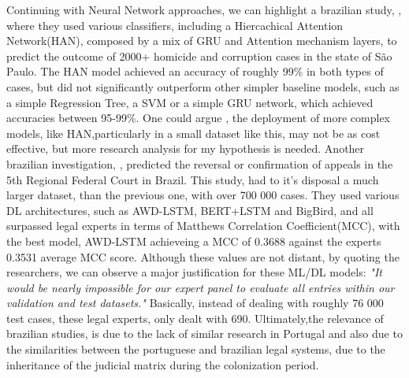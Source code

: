 \documentclass[11pt,a4paper,twoside,openright]{book}
\begin{document}
\par Continuing with Neural Network approaches, we can highlight a brazilian study, \textcite{bertalan_using_2024}, where they used various classifiers, 
including a Hiercachical Attention Network(HAN), composed by a mix of GRU and Attention mechanism layers, to predict the outcome of 2000+ homicide and corruption cases in the state of São Paulo.
The HAN model achieved an accuracy of roughly 99\% in both types of cases, but did not significantly outperform other simpler baseline models,
such as a simple Regression Tree, a SVM or a simple GRU network, which achieved accuracies between 95-99\%. One could argue , the deployment of more complex models, like HAN,particularly in a small dataset like this, may not be as 
cost effective, but more research analysis for my hypothesis is needed.
Another brazilian investigation, \textcite{menezes-neto_using_2022}, predicted the reversal or confirmation of appeals in the 5th Regional Federal Court in Brazil. 
This study, had to it's disposal a much larger dataset, than the previous one, with over 700 000 cases. 
They used various DL architectures, such as AWD-LSTM, BERT+LSTM and BigBird, and all surpassed legal experts in terms of Matthews Correlation Coefficient(MCC), with the best model, AWD-LSTM achieveing a MCC of 0.3688 against the experts 0.3531 average MCC score.
Although these values are not distant, by quoting the researchers, we can observe a major justification for these ML/DL models:
\textit{"It would be nearly impossible for our expert panel to evaluate all entries within our validation and test datasets."} Basically, instead of dealing with roughly 76 000 test cases, these legal experts, only dealt with 690.
Ultimately,the relevance of brazilian studies, is due to the lack of similar research in Portugal and also due to the similarities between the portuguese and brazilian legal systems, due to the inheritance of the judicial matrix during the colonization period.
\end{document}
